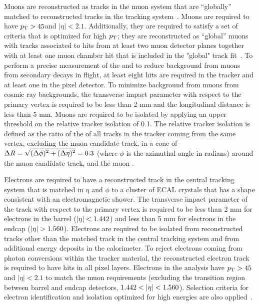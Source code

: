 Muons are reconstructed as tracks in the muon system that are ``globally'' matched to reconstructed tracks in the tracking system~\cite{Chatrchyan:2012xi}.  Muons are required to have $p_{\mathrm{T}} > 45$\GeV and $|\eta| < 2.1$.  Additionally, they are required to satisfy a set of criteria that is optimized for high $p_{\mathrm{T}}$; they are reconstructed as ``global'' muons with tracks associated to hits from at least two muon detector planes together with at least one muon chamber hit that is included in the "global" track fit~\cite{Chatrchyan:2012xi}.  To perform a precise measurement of the \PT and to reduce background from muons from secondary decays in flight, at least eight hits are required in the tracker and at least one in the pixel detector.   To minimize background from muons from cosmic ray backgrounds, the transverse impact parameter with respect to the primary vertex is required to be less than 2 mm and the longitudinal distance is less than 5 mm.  Muons are required to be isolated by applying an upper threshold on the relative tracker isolation of 0.1.  The relative tracker isolation is defined as the ratio of the \PT of all tracks in the tracker coming from the same vertex, excluding the muon candidate track, in a cone of {$\Delta R = \sqrt{\smash[b]{(\Delta \phi) ^2 + (\Delta \eta) ^2}} = 0.3$} (where $\phi$ is the azimuthal angle in radians) around the muon candidate track, and the muon \PT.

Electrons are required to have a reconstructed track in the central tracking system that is matched in $\eta$ and $\phi$ to a cluster of ECAL crystals that has a shape consistent with an electromagnetic shower.  The transverse impact parameter of the track with respect to the primary vertex is required to be less than 2 mm for electrons in the barrel ($\lvert \eta \rvert < 1.442$) and less than 5 mm for electrons in the endcap ($\lvert \eta \rvert > 1.560$).  Electrons are required to be isolated from reconstructed tracks other than the matched track in the central tracking system and from additional energy deposits in the calorimeter.  To reject electrons coming from photon conversions within the tracker material, the reconstructed electron track is required to have hits in all pixel layers.  Electrons in the analysis have $p_{\mathrm{T}} > 45$\GeV and $|\eta| < 2.1$ to match the muon requirements (excluding the transition region between barrel and endcap detectors, $1.442  < \lvert \eta \rvert < 1.560 $).  Selection criteria for electron identification and isolation optimized for high energies are also applied~\cite{CMS-PAPERS-EXO-12-061}.

